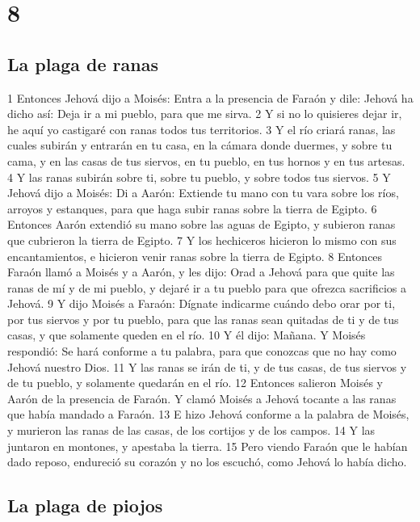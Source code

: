 \chapter{8}

\section*{La plaga de ranas}

1 Entonces Jehová dijo a Moisés: Entra a la presencia de Faraón y dile: Jehová ha dicho así: Deja ir a mi pueblo, para que me sirva.
2 Y si no lo quisieres dejar ir, he aquí yo castigaré con ranas todos tus territorios.
3 Y el río criará ranas, las cuales subirán y entrarán en tu casa, en la cámara donde duermes, y sobre tu cama, y en las casas de tus siervos, en tu pueblo, en tus hornos y en tus artesas.
4 Y las ranas subirán sobre ti, sobre tu pueblo, y sobre todos tus siervos.
5 Y Jehová dijo a Moisés: Di a Aarón: Extiende tu mano con tu vara sobre los ríos, arroyos y estanques, para que haga subir ranas sobre la tierra de Egipto.
6 Entonces Aarón extendió su mano sobre las aguas de Egipto, y subieron ranas que cubrieron la tierra de Egipto.
7 Y los hechiceros hicieron lo mismo con sus encantamientos, e hicieron venir ranas sobre la tierra de Egipto.
8 Entonces Faraón llamó a Moisés y a Aarón, y les dijo: Orad a Jehová para que quite las ranas de mí y de mi pueblo, y dejaré ir a tu pueblo para que ofrezca sacrificios a Jehová.
9 Y dijo Moisés a Faraón: Dígnate indicarme cuándo debo orar por ti, por tus siervos y por tu pueblo, para que las ranas sean quitadas de ti y de tus casas, y que solamente queden en el río.
10 Y él dijo: Mañana. Y Moisés respondió: Se hará conforme a tu palabra, para que conozcas que no hay como Jehová nuestro Dios.
11 Y las ranas se irán de ti, y de tus casas, de tus siervos y de tu pueblo, y solamente quedarán en el río.
12 Entonces salieron Moisés y Aarón de la presencia de Faraón. Y clamó Moisés a Jehová tocante a las ranas que había mandado a Faraón.
13 E hizo Jehová conforme a la palabra de Moisés, y murieron las ranas de las casas, de los cortijos y de los campos.
14 Y las juntaron en montones, y apestaba la tierra.
15 Pero viendo Faraón que le habían dado reposo, endureció su corazón y no los escuchó, como Jehová lo había dicho.

\section*{La plaga de piojos}

